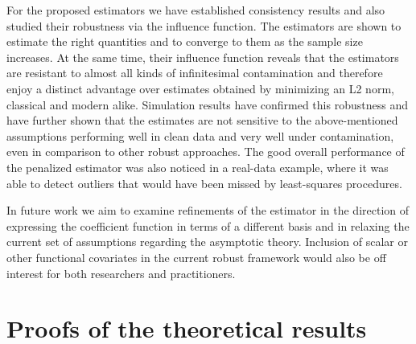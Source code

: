\documentclass[11pt]{article}
\begin{document}
For the proposed estimators we have established consistency results and also studied their robustness via the influence function. The estimators are shown to estimate the right quantities and to converge to them as the sample size increases. At the same time, their influence function reveals that the estimators are resistant to almost all kinds of infinitesimal contamination and therefore enjoy a distinct advantage over estimates obtained by minimizing an L2 norm, classical and modern alike. Simulation results have confirmed this robustness and have further shown that the estimates are not sensitive to the above-mentioned assumptions performing well in clean data and very well under contamination, even in comparison to other robust approaches. The good overall performance of the penalized estimator was also noticed in a real-data example, where it was able to detect outliers that would have been missed by least-squares procedures.

In future work we aim to examine refinements of the estimator in the direction of expressing the coefficient function in terms of a different basis and in relaxing the current set of assumptions regarding the asymptotic theory. Inclusion of scalar or other functional covariates in the current robust framework would also be off interest for both researchers and practitioners.

\newpage
\appendix

\section{Proofs of the theoretical results}
\end{document}
